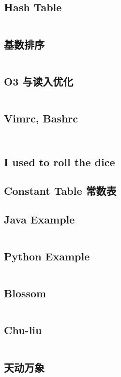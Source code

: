 \documentclass[titlepage, a4paper]{article}
\begin{document}
\begin{multicols}{2}
\begin{spacing}{0.6}
				\subsection{Hash Table}
				\inputminted{cpp}{src/DataStructure/hashmap.cpp}
				\subsection{基数排序}
				\inputminted{cpp}{src/Miscellany/RadixSort.cpp}
				\subsection{O3 与读入优化}
				\inputminted{cpp}{src/Miscellany/hack.cpp}
				\subsection{Vimrc, Bashrc}
				\inputminted{vim}{src/Miscellany/vimrc}
				\inputminted{sh}{src/Miscellany/bashrc}
				\subsection{I used to roll the dice}
				\label{randomprimes}
				\texttt{}
				\subsection{Constant Table 常数表}
				
				\newpage
			\subsection*{Java Example}
				\inputminted{java}{src/Miscellany/Main2.java}
			\subsection*{Python Example}
				\inputminted{python}{src/Miscellany/test.py}
			\subsection*{Blossom}
				\inputminted{python}{src/TreeandGraph/Blossom.cpp}
			\subsection*{Chu-liu}
				\inputminted{cpp}{src/TreeandGraph/最小树形图.cpp}
			\subsection*{天动万象}
				\inputminted{cpp}{src/yzh/ByteCampA3.cpp}
		\end{spacing}
		\endgroup
	\end{multicols}
	
\end{document}
